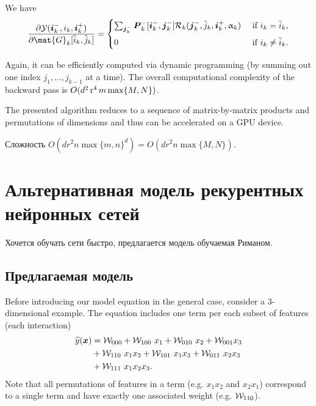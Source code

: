 We have
\begin{align*}
\frac{\partial \tensel{Y}(\vec{i}_k^-, i_k, \vec{i}_k^+)}{\partial \mat{G}_k[\tilde{i}_k, \tilde{j}_k]} =
\begin{cases}
\sum_{\vec{j}_k^-} \vec{P}_k^-[\vec{i}_k^-, \vec{j}_k^-] \tensel{R}_{k}(\vec{j}_{k}^-, \tilde{j}_k, \vec{i}_k^+, \alpha_{k}) & \text{ if } i_k = \tilde{i}_k, \\[0.2cm]
0 & \text{ if } i_k \neq \tilde{i}_k.
\end{cases}
\end{align*}

Again, it can be efficiently computed via dynamic programming (by summing out one index $j_1, \ldots, j_{k-1}$ at a time). The overall computational complexity of the backward pass is $O(d^2 \operatorname{r}^4 m \max\{M, N\})$.

The presented algorithm reduces to a sequence of matrix-by-matrix products and permutations of dimensions and thus can be accelerated on a GPU device.


Сложность $O(d r^2 n \max\{m, n\}^d) = O(d r^2 n \max\{M, N\})$.

\section{Альтернативная модель рекурентных нейронных сетей}
Хочется обучать сети быстро, предлагается модель обучаемая Риманом.

\subsection{Предлагаемая модель}
Before introducing our model equation in the general case, consider a $3$-dimensional example. The equation includes one term per each subset of features (each interaction)
\begin{equation}
\label{eq:polynomial-model-example}
\begin{aligned}
\widehat{y}(\boldsymbol{x}) &= \mathcal{W}_{000} + \mathcal{W}_{100} \,\, x_1 + \mathcal{W}_{010} \,\, x_2 + \mathcal{W}_{001} x_3 \\
&+ \mathcal{W}_{110} \,\, x_1 x_2 + \mathcal{W}_{101} \,\, x_1 x_3 + \mathcal{W}_{011} \,\, x_2 x_3 \\
&+ \mathcal{W}_{111} \,\, x_1 x_2 x_3.
\end{aligned}
\end{equation}
Note that all permutations of features in a term (e.g. $x_1 x_2$ and $x_2 x_1$) correspond to a single term and have exactly one associated weight (e.g. $\mathcal{W}_{110}$).

